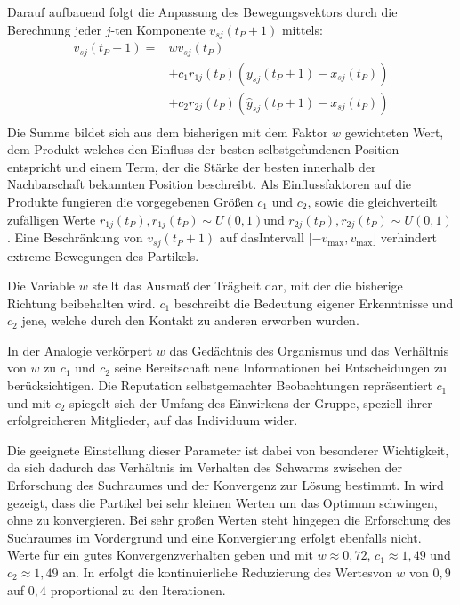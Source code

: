   \noindent Darauf aufbauend folgt die Anpassung des Bewegungsvektors durch die Berechnung jeder $j$-ten Komponente $v_{sj}(t_P+1)$ mittels:
  \begin{equation}\label{DefVUpdate}
    \begin{array}{ll}
      v_{sj}(t_P+1) =& wv_{sj}(t_P)\\
      		     & + c_1r_{1j}(t_P)(y_{sj}(t_P+1)-x_{sj}(t_P))\\
		     & + c_2r_{2j}(t_P)(\hat{y}_{sj}(t_P+1)-x_{sj}(t_P))\\
    \end{array}
  \end{equation}
  Die Summe bildet sich aus dem bisherigen mit dem Faktor $w$ gewichteten Wert, dem Produkt welches den Einfluss der besten selbstgefundenen Position entspricht und einem Term, der die Stärke der besten innerhalb der Nachbarschaft bekannten Position beschreibt. Als Einflussfaktoren auf die Produkte fungieren die vorgegebenen Größen $c_1$ und $c_2$, sowie die gleichverteilt zufälligen Werte $r_{1j}(t_P),r_{1j}(t_P)\sim U(0,1)$\linebreak und $r_{2j}(t_P),r_{2j}(t_P)\sim U(0,1)$. Eine Beschränkung von $v_{sj}(t_P+1)$ auf das\linebreak Intervall $\lbrack -v_{\textrm{max}}, v_{\textrm{max}}\rbrack$ verhindert extreme Bewegungen des Partikels.  

  Die Variable $w$ stellt das Ausmaß der Trägheit dar, mit der die bisherige Richtung beibehalten wird. $c_1$ beschreibt die Bedeutung eigener Erkenntnisse und $c_2$ jene, welche durch den Kontakt zu anderen erworben wurden.

  In der Analogie verkörpert $w$ das Gedächtnis des Organismus und das Verhältnis von $w$ zu $c_1$ und $c_2$ seine Bereitschaft neue Informationen bei Entscheidungen zu berücksichtigen. Die Reputation selbstgemachter Beobachtungen repräsentiert $c_1$ und mit $c_2$ spiegelt sich der Umfang des Einwirkens der Gruppe, speziell ihrer erfolg\-reicheren Mitglieder, auf das Individuum wider.

  Die geeignete Einstellung dieser Parameter ist dabei von besonderer Wichtigkeit, da sich dadurch das Verhältnis im Verhalten des Schwarms zwischen der Erforschung des Suchraumes und der Konvergenz zur Lösung bestimmt. In \cite{Eberhart2001} wird gezeigt, dass die Partikel bei sehr kleinen Werten um das Optimum schwingen, ohne zu konvergieren. Bei sehr großen Werten steht hingegen die Erforschung des Suchraumes im Vordergrund und eine Konvergierung erfolgt ebenfalls nicht. Werte für ein gutes Konvergenzverhalten geben \cite{Omran2005d} und \cite{Ning2004} mit $w\approx 0,72$, $c_1\approx 1,49$ und $c_2\approx 1,49$ an. In \cite{Huang2005} erfolgt die kontinuierliche Reduzierung des Wertes\linebreak von $w$ von $0,9$ auf $0,4$ proportional zu den Iterationen.

